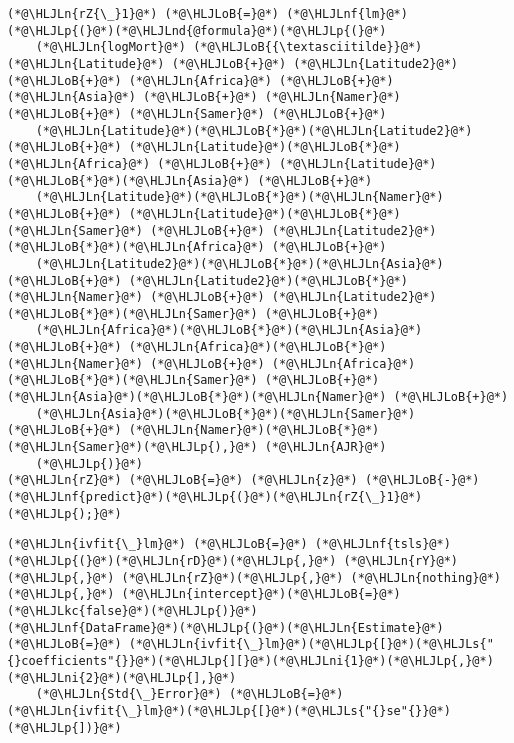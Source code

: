 \documentclass[12pt,a4paper]{article}
\newcommand{\HLJLkc}[1]{\textcolor[RGB]{59,151,46}{\textit{#1}}}
\newcommand{\HLJLn}[1]{#1}
\newcommand{\HLJLnd}[1]{\textcolor[RGB]{214,102,97}{#1}}
\newcommand{\HLJLnf}[1]{\textcolor[RGB]{66,102,213}{#1}}
\newcommand{\HLJLs}[1]{\textcolor[RGB]{201,61,57}{#1}}
\newcommand{\HLJLni}[1]{\textcolor[RGB]{59,151,46}{#1}}
\newcommand{\HLJLoB}[1]{\textcolor[RGB]{102,102,102}{\textbf{#1}}}
\newcommand{\HLJLp}[1]{#1}
\begin{document}
\begin{lstlisting}
(*@\HLJLn{rZ{\_}1}@*) (*@\HLJLoB{=}@*) (*@\HLJLnf{lm}@*)(*@\HLJLp{(}@*)(*@\HLJLnd{@formula}@*)(*@\HLJLp{(}@*)
    (*@\HLJLn{logMort}@*) (*@\HLJLoB{{\textasciitilde}}@*) (*@\HLJLn{Latitude}@*) (*@\HLJLoB{+}@*) (*@\HLJLn{Latitude2}@*) (*@\HLJLoB{+}@*) (*@\HLJLn{Africa}@*) (*@\HLJLoB{+}@*) (*@\HLJLn{Asia}@*) (*@\HLJLoB{+}@*) (*@\HLJLn{Namer}@*) (*@\HLJLoB{+}@*) (*@\HLJLn{Samer}@*) (*@\HLJLoB{+}@*) 
    (*@\HLJLn{Latitude}@*)(*@\HLJLoB{*}@*)(*@\HLJLn{Latitude2}@*) (*@\HLJLoB{+}@*) (*@\HLJLn{Latitude}@*)(*@\HLJLoB{*}@*)(*@\HLJLn{Africa}@*) (*@\HLJLoB{+}@*) (*@\HLJLn{Latitude}@*)(*@\HLJLoB{*}@*)(*@\HLJLn{Asia}@*) (*@\HLJLoB{+}@*) 
    (*@\HLJLn{Latitude}@*)(*@\HLJLoB{*}@*)(*@\HLJLn{Namer}@*) (*@\HLJLoB{+}@*) (*@\HLJLn{Latitude}@*)(*@\HLJLoB{*}@*)(*@\HLJLn{Samer}@*) (*@\HLJLoB{+}@*) (*@\HLJLn{Latitude2}@*)(*@\HLJLoB{*}@*)(*@\HLJLn{Africa}@*) (*@\HLJLoB{+}@*) 
    (*@\HLJLn{Latitude2}@*)(*@\HLJLoB{*}@*)(*@\HLJLn{Asia}@*) (*@\HLJLoB{+}@*) (*@\HLJLn{Latitude2}@*)(*@\HLJLoB{*}@*)(*@\HLJLn{Namer}@*) (*@\HLJLoB{+}@*) (*@\HLJLn{Latitude2}@*)(*@\HLJLoB{*}@*)(*@\HLJLn{Samer}@*) (*@\HLJLoB{+}@*) 
    (*@\HLJLn{Africa}@*)(*@\HLJLoB{*}@*)(*@\HLJLn{Asia}@*) (*@\HLJLoB{+}@*) (*@\HLJLn{Africa}@*)(*@\HLJLoB{*}@*)(*@\HLJLn{Namer}@*) (*@\HLJLoB{+}@*) (*@\HLJLn{Africa}@*)(*@\HLJLoB{*}@*)(*@\HLJLn{Samer}@*) (*@\HLJLoB{+}@*) (*@\HLJLn{Asia}@*)(*@\HLJLoB{*}@*)(*@\HLJLn{Namer}@*) (*@\HLJLoB{+}@*) 
    (*@\HLJLn{Asia}@*)(*@\HLJLoB{*}@*)(*@\HLJLn{Samer}@*) (*@\HLJLoB{+}@*) (*@\HLJLn{Namer}@*)(*@\HLJLoB{*}@*)(*@\HLJLn{Samer}@*)(*@\HLJLp{),}@*) (*@\HLJLn{AJR}@*)
    (*@\HLJLp{)}@*)
(*@\HLJLn{rZ}@*) (*@\HLJLoB{=}@*) (*@\HLJLn{z}@*) (*@\HLJLoB{-}@*) (*@\HLJLnf{predict}@*)(*@\HLJLp{(}@*)(*@\HLJLn{rZ{\_}1}@*)(*@\HLJLp{);}@*)
\end{lstlisting}


\begin{lstlisting}
(*@\HLJLn{ivfit{\_}lm}@*) (*@\HLJLoB{=}@*) (*@\HLJLnf{tsls}@*)(*@\HLJLp{(}@*)(*@\HLJLn{rD}@*)(*@\HLJLp{,}@*) (*@\HLJLn{rY}@*)(*@\HLJLp{,}@*) (*@\HLJLn{rZ}@*)(*@\HLJLp{,}@*) (*@\HLJLn{nothing}@*)(*@\HLJLp{,}@*) (*@\HLJLn{intercept}@*)(*@\HLJLoB{=}@*)(*@\HLJLkc{false}@*)(*@\HLJLp{)}@*)
(*@\HLJLnf{DataFrame}@*)(*@\HLJLp{(}@*)(*@\HLJLn{Estimate}@*) (*@\HLJLoB{=}@*) (*@\HLJLn{ivfit{\_}lm}@*)(*@\HLJLp{[}@*)(*@\HLJLs{"{}coefficients"{}}@*)(*@\HLJLp{][}@*)(*@\HLJLni{1}@*)(*@\HLJLp{,}@*)(*@\HLJLni{2}@*)(*@\HLJLp{],}@*) 
    (*@\HLJLn{Std{\_}Error}@*) (*@\HLJLoB{=}@*) (*@\HLJLn{ivfit{\_}lm}@*)(*@\HLJLp{[}@*)(*@\HLJLs{"{}se"{}}@*)(*@\HLJLp{])}@*)
\end{lstlisting}
\end{document}
